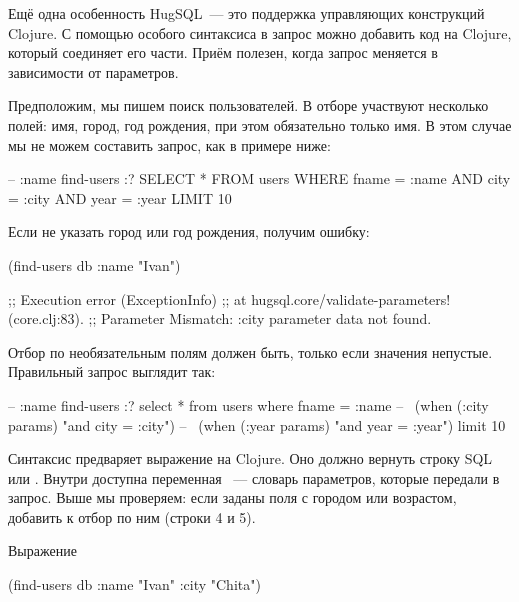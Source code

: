 Ещё одна особенность HugSQL~--- это поддержка управляющих конструкций Clojure. С помощью особого синтаксиса в запрос можно добавить код на Clojure, который соединяет его части. Приём полезен, когда запрос меняется в зависимости от параметров.

Предположим, мы пишем поиск пользователей. В отборе участвуют несколько полей: имя, город, год рождения, при этом обязательно только имя. В этом случае мы не можем составить запрос, как в примере ниже:

\begin{english}
  \begin{sql}
-- :name find-users :?
SELECT * FROM users
WHERE fname = :name
  AND city = :city
  AND year = :year
LIMIT 10
  \end{sql}
\end{english}

Если не указать город или год рождения, получим ошибку:

\begin{english}
  \begin{clojure}
(find-users db {:name "Ivan"})

;; Execution error (ExceptionInfo)
;; at hugsql.core/validate-parameters! (core.clj:83).
;; Parameter Mismatch: :city parameter data not found.
  \end{clojure}
\end{english}

Отбор по необязательным полям должен быть, только если значения непустые. Правильный запрос выглядит так:

\begin{english}
  \begin{sql/lines}
-- :name find-users :?
select * from users
where fname = :name
--~ (when (:city params) "and city = :city")
--~ (when (:year params) "and year = :year")
limit 10
  \end{sql/lines}
\end{english}

Синтаксис \code{-{}-{}\textasciitilde{}} предваряет выражение на Clojure. Оно должно вернуть строку SQL или . Внутри доступна переменная ~--- словарь параметров, которые передали в запрос. Выше мы проверяем: если заданы поля с городом или возрастом, добавить к  отбор по ним (строки 4 и 5).

\pagebreaklarge

Выражение

\begin{english}
  \begin{clojure}
(find-users db {:name "Ivan" :city "Chita"})
  \end{clojure}
\end{english}

